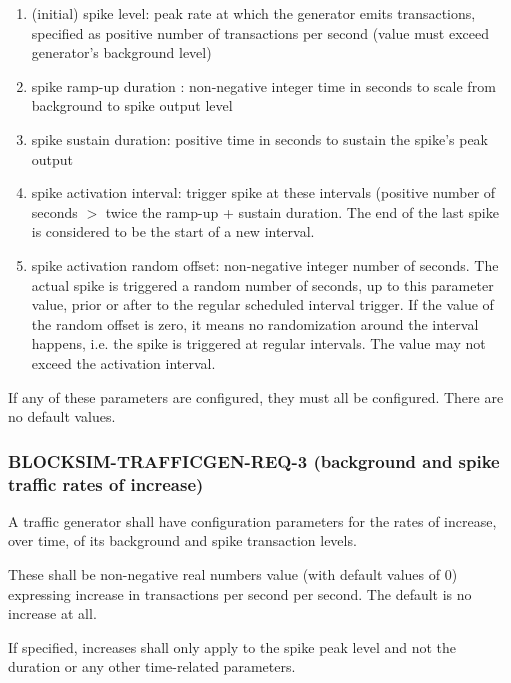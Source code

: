 \documentclass{scrreprt}
\begin{document}
        \begin{enumerate}
          \item (initial) spike level:
            peak rate at which the generator emits transactions,
            specified as positive number of transactions per
            second (value must exceed generator's background level)
          \item spike ramp-up duration :
            non-negative integer time in seconds to scale from background
            to spike output level
          \item spike sustain duration:
            positive time in seconds to sustain the spike's peak output
          \item spike activation interval:
            trigger spike at these intervals (positive number of
            seconds $>$ twice the ramp-up + sustain duration.
            The end of the last spike is considered to be the start of a new
            interval.
          \item spike activation random offset:
            non-negative integer number of seconds.
            The actual spike is triggered a random number of seconds, up to
            this parameter value, prior or after to the regular scheduled
            interval trigger.
            If the value of the random offset is zero, it means no
            randomization around the interval happens, i.e. the spike is
            triggered at regular intervals.
            The value may not exceed the activation interval.
        \end{enumerate}

        If any of these parameters are configured, they must all be configured.
        There are no default values.

      \subsubsection{BLOCKSIM-TRAFFICGEN-REQ-3 (background and spike traffic rates of increase)}

        A traffic generator shall have configuration parameters for the rates
        of increase, over time, of its background and spike transaction levels.

        These shall be non-negative real numbers value (with default values of
        0) expressing increase in transactions per second per second.
        The default is no increase at all.

        If specified, increases shall only apply to the spike peak level and
        not the duration or any other time-related parameters.
\end{document}
